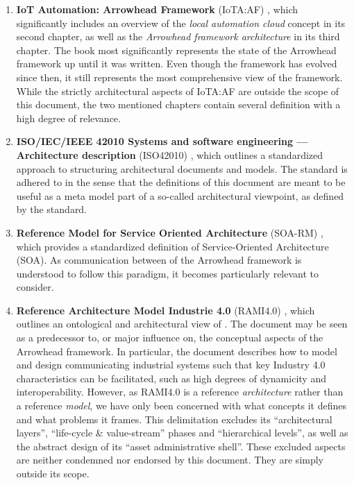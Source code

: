 \begin{enumerate}

\item \textbf{IoT Automation: Arrowhead Framework} (IoTA:AF) \cite{delsing2017iot}, which significantly includes an overview of the \textit{local automation cloud} concept in its second chapter, as well as the \textit{Arrowhead framework architecture} in its third chapter.
The book most significantly represents the state of the Arrowhead framework up until it was written.
Even though the framework has evolved since then, it still represents the most comprehensive view of the framework.
While the strictly architectural aspects of IoTA:AF are outside the scope of this document, the two mentioned chapters contain several definition with a high degree of relevance.

\item \textbf{ISO/IEC/IEEE 42010 Systems and software engineering — Architecture description} (ISO42010) \cite{iso42010}, which outlines a standardized approach to structuring architectural documents and models.
The standard is adhered to in the sense that the definitions of this document are meant to be useful as a meta model part of a so-called architectural viewpoint, as defined by the standard.

\item \textbf{Reference Model for Service Oriented Architecture} (SOA-RM) \cite{mackenzie2006reference}, which provides a standardized definition of Service-Oriented Architecture (SOA).
As communication between  of the Arrowhead framework is understood to follow this paradigm, it becomes particularly relevant to consider.

\item \textbf{Reference Architecture Model Industrie 4.0} (RAMI4.0) \cite{adolphs2016reference}, which outlines an ontological and architectural view of .
The document may be seen as a predecessor to, or major influence on, the conceptual aspects of the Arrowhead framework.
In particular, the document describes how to model and design communicating industrial systems such that key Industry 4.0 characteristics can be facilitated, such as high degrees of dynamicity and interoperability.
However, as RAMI4.0 is a reference \textit{architecture} rather than a reference \textit{model}, we have only been concerned with what concepts it defines and what problems it frames.
This delimitation excludes its ``architectural layers'', ``life-cycle \& value-stream'' phases and ``hierarchical levels'', as well as the abstract design of its ``asset administrative shell''.
These excluded aspects are neither condemned nor endorsed by this document.
They are simply outside its scope.

\end{enumerate}

